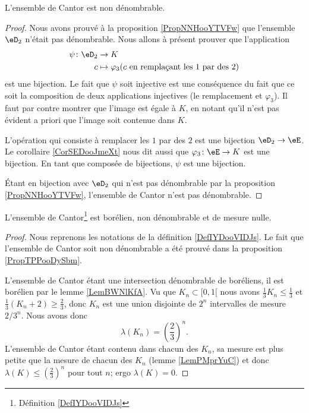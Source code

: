 \begin{proposition}    \label{PropTPPooDySbm}
    L'ensemble de Cantor est non dénombrable.
\end{proposition}

\begin{proof}

    Nous avons prouvé à la proposition \ref{PropNNHooYTVFw} que l'ensemble \( \eD_2\) n'était pas dénombrable. Nous allons à présent prouver que l'application
    \begin{equation}
        \begin{aligned}
            \psi\colon \eD_2&\to K \\
            c&\mapsto \varphi_3(   c\text{ en remplaçant les } 1\text{ par des } 2  ) 
        \end{aligned}
    \end{equation}
    est une bijection. Le fait que \( \psi\) soit injective est une conséquence du fait que ce soit la composition de deux applications injectives (le remplacement et \( \varphi_3\)). Il faut par contre montrer que l'image est égale à \( K\), en notant qu'il n'est pas évident a priori que l'image soit contenue dans \( K\).

    L'opération qui consiste à remplacer les \( 1\) par des \( 2\) est une bijection \( \eD_2\to \eE\). Le corollaire \ref{CorSEDooJmeXt} nous dit aussi que \( \varphi_3\colon \eE\to K\) est une bijection. En tant que composée de bijections, \( \psi\) est une bijection.

    Étant en bijection avec \( \eD_2\) qui n'est pas dénombrable par la proposition \ref{PropNNHooYTVFw}, l'ensemble de Cantor n'est pas dénombrable.
\end{proof}

\begin{proposition}    \label{PropBEWooXZdKN}
    L'ensemble de Cantor\footnote{Définition \ref{DefIYDooVIDJs}} est borélien, non dénombrable et de mesure nulle.
\end{proposition}

\begin{proof}
    Nous reprenons les notations de la définition \ref{DefIYDooVIDJs}. Le fait que l'ensemble de Cantor soit non dénombrable a été prouvé dans la proposition \ref{PropTPPooDySbm}.

    L'ensemble de Cantor étant une intersection dénombrable de boréliens, il est borélien par le lemme \ref{LemBWNlKfA}. Vu que \( K_n\subset\mathopen[ 0 , 1 [\) nous avons \( \frac{1}{ 3 }K_n\leq \frac{1}{ 3 }\) et \( \frac{1}{ 3 }(K_n+2)\geq \frac{ 2 }{ 3 }\), donc \( K_n\) est une union disjointe de \( 2^n\) intervalles de mesure \( 2/3^n\). Nous avons donc
        \begin{equation}
            \lambda(K_n)=\left( \frac{ 2 }{ 3 } \right)^n.
        \end{equation}
        L'ensemble de Cantor étant contenu dans chacun des \( K_n\), sa mesure est plus petite que la mesure de chacun des \( K_n\) (lemme \ref{LemPMprYuC}) et donc \( \lambda(K)\leq \left( \frac{ 2 }{ 3 } \right)^n\) pour tout \( n\); ergo \( \lambda(K)=0\).
\end{proof}

